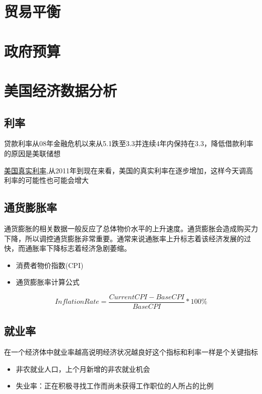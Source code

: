 \section{贸易平衡}
\section{政府预算}


\section{美国经济数据分析}



\subsection{利率}



贷款利率从08年金融危机以来从5.1跌至3.3并连续4年内保持在3.3，降低借款利率的原因是美联储想

\href{http://data.worldbank.org/indicator/FR.INR.RINR/countries/US?display=graph}{美国真实利率},从2011年到现在来看，美国的真实利率在逐步增加，这样今天调高利率的可能性也可能会增大



\subsection{通货膨胀率}

通货膨胀的相关数据一般反应了总体物价水平的上升速度。通货膨胀会造成购买力下降，所以调控通货膨胀非常重要。通常来说通胀率上升标志着该经济发展的过快，而通胀率下降标志着经济急剧萎缩。

\begin{itemize}
\item 消费者物价指数(CPI)
\item 通货膨胀率计算公式
\end{itemize}
$$Inflation Rate=\frac{Current CPI-Base CPI}{Base CPI}*100\%$$

\subsection{就业率}
在一个经济体中就业率越高说明经济状况越良好这个指标和利率一样是个关键指标
\begin{itemize}
\item 非农就业人口，上个月新增的非农就业机会
\item 失业率：正在积极寻找工作而尚未获得工作职位的人所占的比例
\end{itemize}

